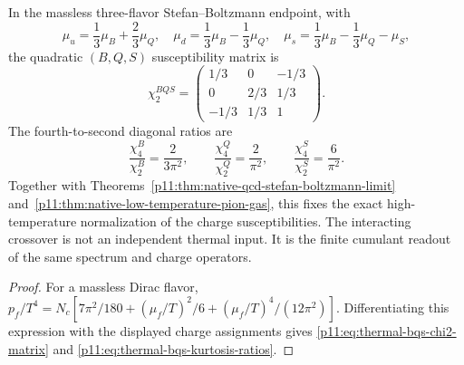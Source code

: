 \documentclass[12pt,a4paper]{article}
\begin{document}
\begin{corollary}
\label{p11:cor:thermal-bqs-susceptibility-endpoint}
In the massless three-flavor Stefan--Boltzmann endpoint, with
\begin{equation}
\mu_u=\frac13\mu_B+\frac23\mu_Q,
\quad
\mu_d=\frac13\mu_B-\frac13\mu_Q,
\quad
\mu_s=\frac13\mu_B-\frac13\mu_Q-\mu_S,
\end{equation}
the quadratic \((B,Q,S)\) susceptibility matrix is
\begin{equation}
\label{p11:eq:thermal-bqs-chi2-matrix}
\chi_2^{BQS}=
\begin{pmatrix}
1/3 & 0 & -1/3\\
0 & 2/3 & 1/3\\
-1/3 & 1/3 & 1
\end{pmatrix}.
\end{equation}
The fourth-to-second diagonal ratios are
\begin{equation}
\label{p11:eq:thermal-bqs-kurtosis-ratios}
\frac{\chi_4^B}{\chi_2^B}=\frac{2}{3\pi^2},
\qquad
\frac{\chi_4^Q}{\chi_2^Q}=\frac{2}{\pi^2},
\qquad
\frac{\chi_4^S}{\chi_2^S}=\frac{6}{\pi^2}.
\end{equation}
Together with Theorems~\ref{p11:thm:native-qcd-stefan-boltzmann-limit}
and~\ref{p11:thm:native-low-temperature-pion-gas}, this fixes the exact
high-temperature normalization of the charge susceptibilities.  The interacting
crossover is not an independent thermal input.  It is the finite cumulant
readout of the same spectrum and charge operators.
\end{corollary}
\begin{proof}
For a massless Dirac flavor, \(p_f/T^4=N_c[7\pi^2/180+(\mu_f/T)^2/6+(\mu_f/T)^4/(12\pi^2)]\).  Differentiating this expression with the displayed charge assignments gives \eqref{p11:eq:thermal-bqs-chi2-matrix} and \eqref{p11:eq:thermal-bqs-kurtosis-ratios}.
\end{proof}
\end{document}
